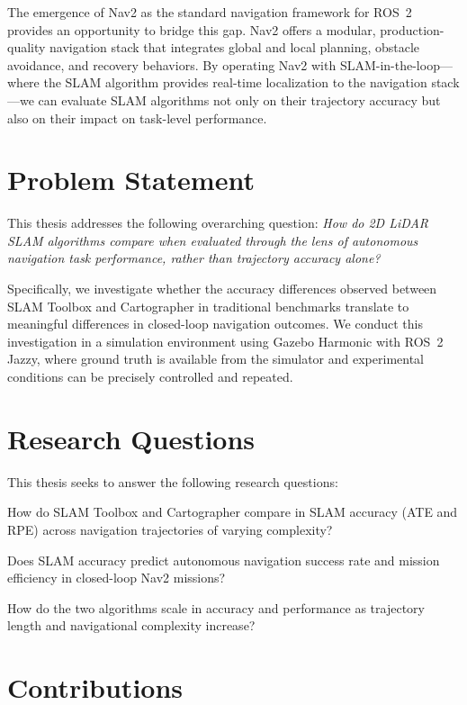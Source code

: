 The emergence of Nav2 \citep{macenski2020nav2} as the standard navigation framework for ROS~2 provides an opportunity to bridge this gap. Nav2 offers a modular, production-quality navigation stack that integrates global and local planning, obstacle avoidance, and recovery behaviors. By operating Nav2 with SLAM-in-the-loop---where the SLAM algorithm provides real-time localization to the navigation stack---we can evaluate SLAM algorithms not only on their trajectory accuracy but also on their impact on task-level performance.

\section{Problem Statement}

This thesis addresses the following overarching question: \emph{How do 2D LiDAR SLAM algorithms compare when evaluated through the lens of autonomous navigation task performance, rather than trajectory accuracy alone?}

Specifically, we investigate whether the accuracy differences observed between SLAM Toolbox and Cartographer in traditional benchmarks translate to meaningful differences in closed-loop navigation outcomes. We conduct this investigation in a simulation environment using Gazebo Harmonic with ROS~2 Jazzy, where ground truth is available from the simulator and experimental conditions can be precisely controlled and repeated.

\section{Research Questions}

This thesis seeks to answer the following research questions:

\begin{description}[style=nextline]
\item[RQ1:] How do SLAM Toolbox and Cartographer compare in SLAM accuracy (ATE and RPE) across navigation trajectories of varying complexity?
\item[RQ2:] Does SLAM accuracy predict autonomous navigation success rate and mission efficiency in closed-loop Nav2 missions?
\item[RQ3:] How do the two algorithms scale in accuracy and performance as trajectory length and navigational complexity increase?
\end{description}

\section{Contributions}

